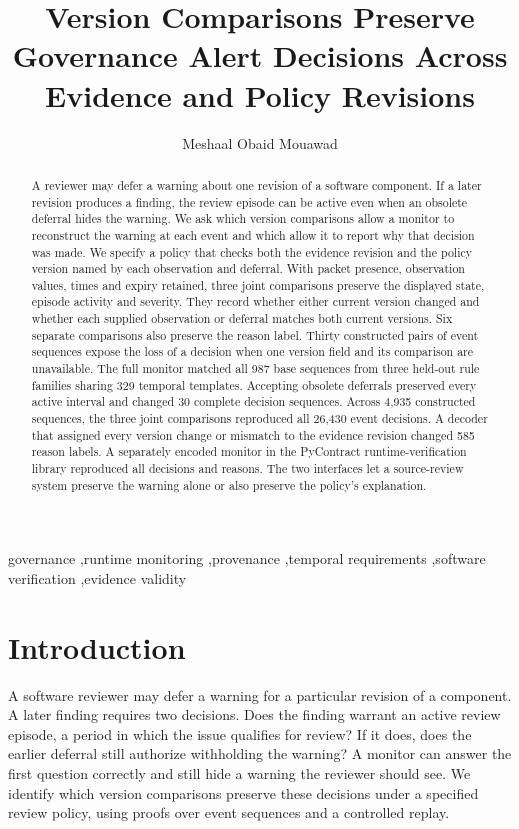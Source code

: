 \documentclass[preprint,11pt]{elsarticle}
\begin{document}
\begin{frontmatter}
\title{Version Comparisons Preserve Governance Alert Decisions Across Evidence and Policy Revisions}
\author[msu]{Meshaal Obaid Mouawad}
\address[msu]{Department of Electrical and Computer Engineering, Mississippi State University, Box 9571, Mississippi State, MS 39762, USA}
\begin{abstract}
A reviewer may defer a warning about one revision of a software component. If a later revision produces a finding, the review episode can be active even when an obsolete deferral hides the warning. We ask which version comparisons allow a monitor to reconstruct the warning at each event and which allow it to report why that decision was made. We specify a policy that checks both the evidence revision and the policy version named by each observation and deferral. With packet presence, observation values, times and expiry retained, three joint comparisons preserve the displayed state, episode activity and severity. They record whether either current version changed and whether each supplied observation or deferral matches both current versions. Six separate comparisons also preserve the reason label. Thirty constructed pairs of event sequences expose the loss of a decision when one version field and its comparison are unavailable. The full monitor matched all 987 base sequences from three held-out rule families sharing 329 temporal templates. Accepting obsolete deferrals preserved every active interval and changed 30 complete decision sequences. Across 4,935 constructed sequences, the three joint comparisons reproduced all 26,430 event decisions. A decoder that assigned every version change or mismatch to the evidence revision changed 585 reason labels. A separately encoded monitor in the PyContract runtime-verification library reproduced all decisions and reasons. The two interfaces let a source-review system preserve the warning alone or also preserve the policy's explanation.
\end{abstract}
\begin{keyword}
governance \sep runtime monitoring \sep provenance \sep temporal requirements \sep software verification \sep evidence validity
\end{keyword}
\end{frontmatter}


\section{Introduction}\label{sec:introduction}
A software reviewer may defer a warning for a particular revision of a component. A later finding requires two decisions. Does the finding warrant an active review episode, a period in which the issue qualifies for review? If it does, does the earlier deferral still authorize withholding the warning? A monitor can answer the first question correctly and still hide a warning the reviewer should see. We identify which version comparisons preserve these decisions under a specified review policy, using proofs over event sequences and a controlled replay.
\end{document}
